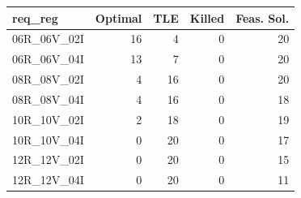 
\begin{tabular}{lrrrr}
\toprule
req\_reg & Optimal & TLE & Killed & Feas. Sol.\\
\midrule
06R\_06V\_02I & 16 & 4 & 0 & 20\\
06R\_06V\_04I & 13 & 7 & 0 & 20\\
08R\_08V\_02I & 4 & 16 & 0 & 20\\
08R\_08V\_04I & 4 & 16 & 0 & 18\\
10R\_10V\_02I & 2 & 18 & 0 & 19\\
\addlinespace
10R\_10V\_04I & 0 & 20 & 0 & 17\\
12R\_12V\_02I & 0 & 20 & 0 & 15\\
12R\_12V\_04I & 0 & 20 & 0 & 11\\
\bottomrule
\end{tabular}
